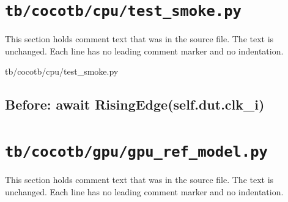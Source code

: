 \section{\texttt{tb/cocotb/cpu/test\_smoke.py}}\label{tm:suite:cpu-test-smoke}

This section holds comment text that was in the source file. The text is unchanged. Each line has no leading comment marker and no indentation.

\begin{relocated}{tb/cocotb/cpu/test_smoke.py}

\subsection*{Before: await RisingEdge(self.dut.clk\_i)}


\end{relocated}

\section{\texttt{tb/cocotb/gpu/gpu\_ref\_model.py}}\label{tm:suite:gpu-gpu-ref-model}

This section holds comment text that was in the source file. The text is unchanged. Each line has no leading comment marker and no indentation.

